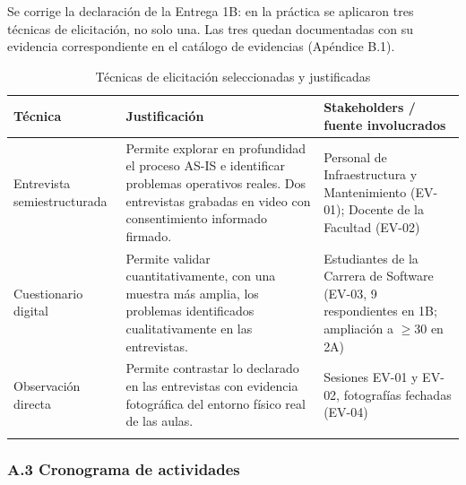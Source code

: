 
Se corrige la declaración de la Entrega 1B: en la práctica se aplicaron tres técnicas de elicitación, no solo una. Las tres quedan documentadas con su evidencia correspondiente en el catálogo de evidencias (Apéndice B.1).


\begingroup
\small
\begin{longtable}{|p{5.2cm}|p{5.2cm}|p{5.2cm}|}
\hline
Técnica & Justificación & Stakeholders / fuente involucrados \\ \hline
Entrevista semiestructurada & Permite explorar en profundidad el proceso AS-IS e identificar problemas operativos reales. Dos entrevistas grabadas en video con consentimiento informado firmado. & Personal de Infraestructura y Mantenimiento (EV-01); Docente de la Facultad (EV-02) \\ \hline
Cuestionario digital & Permite validar cuantitativamente, con una muestra más amplia, los problemas identificados cualitativamente en las entrevistas. & Estudiantes de la Carrera de Software (EV-03, 9 respondientes en 1B; ampliación a $\geq$30 en 2A) \\ \hline
Observación directa & Permite contrastar lo declarado en las entrevistas con evidencia fotográfica del entorno físico real de las aulas. & Sesiones EV-01 y EV-02, fotografías fechadas (EV-04) \\ \hline
\caption{Técnicas de elicitación seleccionadas y justificadas}
\end{longtable}
\endgroup

\subsubsection*{A.3 Cronograma de actividades}


